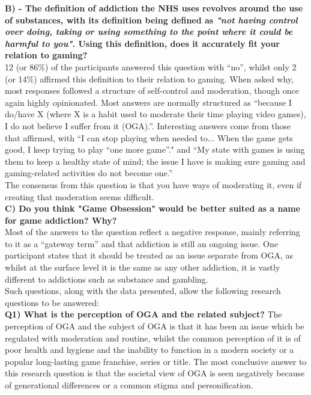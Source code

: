 \documentclass[conference]{IEEEtran}
\begin{document}
 \textbf{B) - The definition of addiction the NHS uses revolves around the use of substances, with its definition being defined as \textit{"not having control over doing, taking or using something to the point where it could be harmful to you"}. Using this definition, does it accurately fit your relation to gaming?}\\

12 (or 86\%) of the participants answered this question with “no”, whilst only 2 (or 14\%) affirmed this definition to their relation to gaming. When asked why, most responses followed a structure of self-control and moderation, though once again highly opinionated. Most answers are normally structured as “because I do/have X (where X is a habit used to moderate their time playing video games), I do not believe I suffer from it (OGA).”. Interesting answers come from those that affirmed, with “I can stop playing when needed to... When the game gets good, I keep trying to play “one more game”." and “My state with games is using them to keep a healthy state of mind; the issue I have is making sure gaming and gaming-related activities do not become one.”\\ 

The consensus from this question is that you have ways of moderating it, even if creating that moderation seems difficult.\\

 \textbf{C) Do you think "Game Obsession" would be better suited as a name for game addiction? Why?}\\

Most of the answers to the question reflect a negative response, mainly referring to it as a “gateway term” and that addiction is still an ongoing issue. One participant states that it should be treated as an issue separate from OGA, as whilst at the surface level it is the same as any other addiction, it is vastly different to addictions such as substance and gambling.\\

Such questions, along with the data presented, allow the following research questions to be answered:\\

 \textbf{Q1)  What is the perception of OGA and the related subject?}
The perception of OGA and the subject of OGA is that it has been an issue which be regulated with moderation and routine, whilst the common perception of it is of poor health and hygiene and the inability to function in a modern society or a popular long-lasting game franchise, series or title. The most conclusive answer to this research question is that the societal view of OGA is seen negatively because of generational differences or a common stigma and personification.\\
\end{document}

